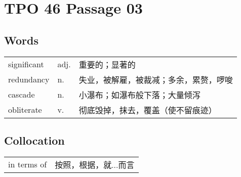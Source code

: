 \section{TPO 46 Passage 03}

\subsection{Words}

\begin{tabular}{lll}
    significant & adj. & 重要的；显著的             \\
    redundancy  & n.   & 失业，被解雇，被裁减；多余，累赘，啰唆 \\
    cascade     & n.   & 小瀑布；如瀑布般下落；大量倾泻     \\
    obliterate  & v.   & 彻底毁掉，抹去，覆盖（使不留痕迹）   \\
\end{tabular}

\subsection{Collocation}

\begin{tabular}{ll}
    in terms of & 按照，根据，就...而言 \\
\end{tabular}
